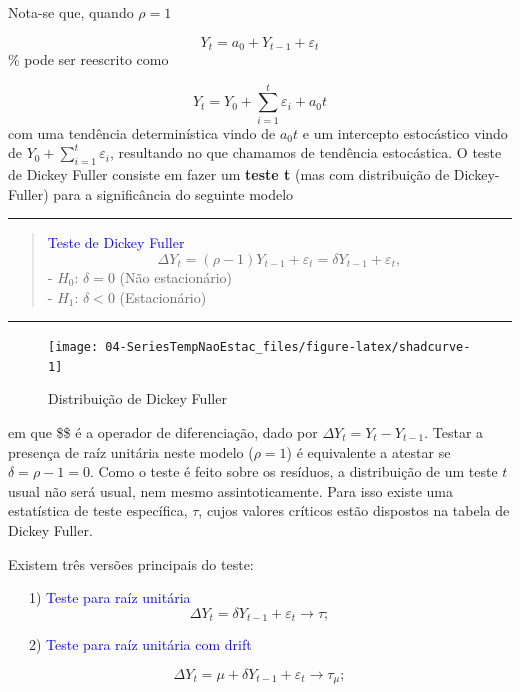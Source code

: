 \documentclass[
]{book}
\theoremstyle{definition}
\theoremstyle{definition}
\theoremstyle{definition}
\theoremstyle{remark}
\begin{document}
Nota-se que, quando \(\rho=1\)

\[Y_t =a_0 +Y_{t-1}+ \varepsilon_t\]
\%
pode ser reescrito como

\[Y_t = Y_0 + \sum_{i=1}^t \varepsilon_i + a_0t \]
com uma tendência determinística vindo de \(a_0t\) e um intercepto estocástico vindo de \(Y_0 + \sum_{i=1}^t \varepsilon_i\), resultando no que chamamos de tendência estocástica. O teste de Dickey Fuller consiste em fazer um \textbf{teste t} (mas com distribuição de Dickey-Fuller) para a significância do seguinte modelo

\begin{center}\rule{0.5\linewidth}{0.5pt}\end{center}

\begin{quote}
\textcolor{blue}{ Teste de Dickey Fuller}
\begin{equation*}
\Delta  Y_{t}=(\rho-1)Y_{t-1}+\varepsilon_{t}=\delta Y_{t-1}+\varepsilon_{t},
\end{equation*}
- \(H_0\): \(\delta=0\) (Não estacionário)\\
- \(H_1\): \(\delta<0\) (Estacionário)
\end{quote}

\begin{center}\rule{0.5\linewidth}{0.5pt}\end{center}

\begin{figure}
\texttt{[image: 04-SeriesTempNaoEstac\_files/figure-latex/shadcurve-1]} \caption{Distribuição de Dickey Fuller}\label{fig:shadcurve}
\end{figure}

em que \$\Delta \$ é a operador de diferenciação, dado por \(\Delta Y_t=Y_t-Y_{t-1}\). Testar a presença de raíz unitária neste modelo (\(\rho=1\)) é equivalente a atestar se \(\delta=\rho-1=0\). Como o teste é feito sobre os resíduos, a distribuição de um teste \(t\) usual não será usual, nem mesmo assintoticamente. Para isso existe uma estatística de teste específica, \(\tau\), cujos valores críticos estão dispostos na tabela de Dickey Fuller.

Existem três versões principais do teste:

~~~1) \textcolor{blue}{ Teste para raíz unitária} \[\Delta Y_t =\delta Y_{t-1}+\varepsilon_t \rightarrow \tau;\]

~~~2) \textcolor{blue}{ Teste para raíz unitária com drift}

\[\Delta Y_t =\mu+\delta Y_{t-1}+\varepsilon_t\rightarrow \tau_{\mu};\]
\end{document}
